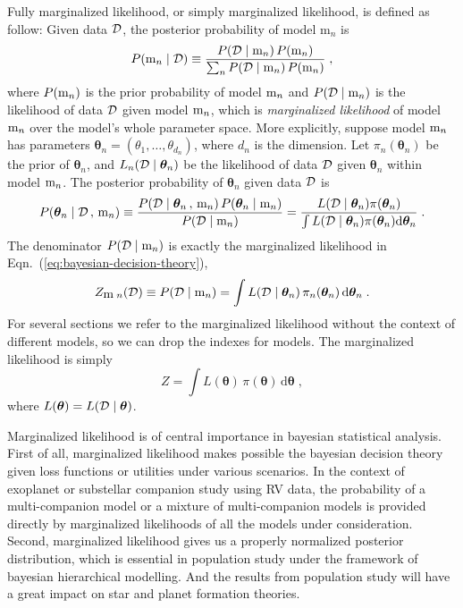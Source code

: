 \documentclass[letterpaper, preprint]{aastex}
\newcommand{\bth} {\boldsymbol \theta}
\newcommand{\md}{\mathrm{d}}
\begin{document}
Fully marginalized likelihood, or simply marginalized likelihood, is defined as follow: Given data $\cal D$, the posterior probability of model $\mathrm{m}_n$ is
\begin{equation}
P(\mathrm{m}_n\mid{\cal D}) \equiv \frac{P({\cal D}\mid\mathrm{m}_n)\,P(\mathrm{m}_n)}{\sum_n{P({\cal D}\mid\mathrm{m}_n)\,P(\mathrm{m}_n)}}\; ,
\label{eq:bayesian-decision-theory}
\end{equation}
where $P( {\mbox m}_n)$ is the prior probability of model ${\mbox m}_n$ and $P({\cal D}\mid {\mbox m}_n)$ is the likelihood of data $\cal D$ given model ${\mbox m}_n$, which is \emph{marginalized likelihood} of model ${\mbox m}_n$ over the model's whole parameter space. More explicitly, suppose model ${\mbox m}_n$ has parameters $\bth_n = (\theta_1,\ldots,\theta_{d_n})$, where $d_n$ is the dimension. Let $\pi_n(\bth_n)$ be the prior of $\bth_n$, and $L_n({\cal D}\mid\bth_n)$ be the likelihood of data $\cal D$ given $\bth_n$ within model ${\mbox m}_n$. The posterior probability of $\bth_n$ given data $\cal D$ is
\begin{equation}
P(\bth_n\mid{\cal D}\, ,\,  {\mbox m}_n) \equiv \frac{P({\cal D}\mid\bth_n\, , \, {\mbox m}_n)\,P(\bth_n\mid {\mbox m}_n)}{P({\cal D}\mid  {\mbox m}_n)} = \frac{L({\cal D}\mid\bth_n)\pi(\bth_n)}{\int{L({\cal D}\mid\bth_n)\pi(\bth_n)\md\bth_n}}\; .
\label{eq:bayesian-posterior}
\end{equation}
The denominator $P({\cal D}\mid {\mbox m}_n)$ is exactly the marginalized likelihood in Eqn.~(\ref{eq:bayesian-decision-theory}),
\begin{equation*}
Z_{ {\mbox m}\;n}({\cal D}) \equiv P({\cal D}\mid {\mbox m}_n) = \int L({\cal D}\mid \bth_n)\, \pi_n(\bth_n) \,\md\bth_n \; .
\end{equation*}
For several sections we refer to the marginalized likelihood without the context of different models, so we can drop the indexes for models. The marginalized likelihood is simply
\begin{equation}
Z = \int\! L(\bth)\,\pi(\bth)\,\md\bth\; ,
\label{eq:evidence-integral}
\end{equation}
where $L(\bth)=L({\cal D}\mid \bth)$. 

Marginalized likelihood is of central importance in bayesian statistical analysis. First of all, marginalized likelihood makes possible the bayesian decision theory given loss functions or utilities under various scenarios. In the context of exoplanet or substellar companion study using RV data, the probability of a multi-companion model or a mixture of multi-companion models is provided directly by marginalized likelihoods of all the models under consideration. Second, marginalized likelihood gives us a properly normalized posterior distribution, which is essential in population study under the framework of bayesian hierarchical modelling. And the results from population study will have a great impact on star and planet formation theories.
\end{document}
